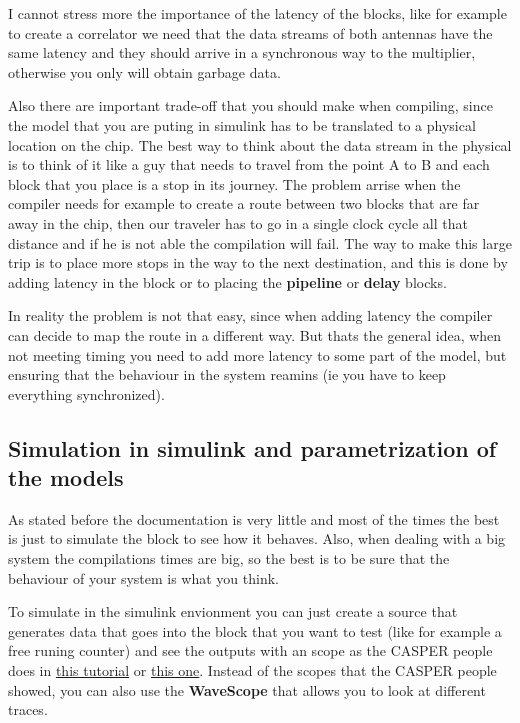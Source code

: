 I cannot stress more the importance of the latency of the blocks, like for example to create a correlator we need that the data streams of both antennas have the same latency and they should arrive in a synchronous way to the multiplier, otherwise you only will obtain garbage data.


Also there are important trade-off that you should make when compiling, since the model that you are puting in simulink has to be translated to a physical location on the chip.
The best way to think about the data stream in the physical is to think of it like a guy that needs to travel from the point A to B and each block that you place is a stop in its journey. The problem arrise when the compiler needs for example to create a route between two blocks that are far away in the chip, then our traveler has to go in a single clock cycle all that distance and if he is not able the compilation will fail. The way to make this large trip is to place more stops in the way to the next destination, and this is done by adding latency in the block or to placing the \textbf{pipeline} or \textbf{delay} blocks. 

In reality the problem is not that easy, since when adding latency the compiler can decide to map the route in a different way. But thats the general idea, when not meeting timing you need to add more latency to some part of the model, but ensuring that the behaviour in the system reamins (ie you have to keep everything synchronized).

\subsection{Simulation in simulink and parametrization of the models}
As stated before the documentation is very little and most of the times the best is just to simulate the block to see how it behaves. Also, when dealing with a big system the compilations times are big, so the best is to be sure that the behaviour of your system is what you think.


To simulate in the simulink envionment you can just create a source that generates data that goes into the block that you want to test (like for example a free runing  counter) and see the outputs with an scope as the CASPER people does in \href{https://casper.berkeley.edu/wiki/Introduction_to_Simulink_ROACH2}{this tutorial} or \href{https://casper-toolflow.readthedocs.io/projects/tutorials/en/latest/tutorials/snap/tut_intro.html}{this one}. Instead of the scopes that the CASPER people showed, you can also use the \textbf{WaveScope} that allows you to look at different traces.


